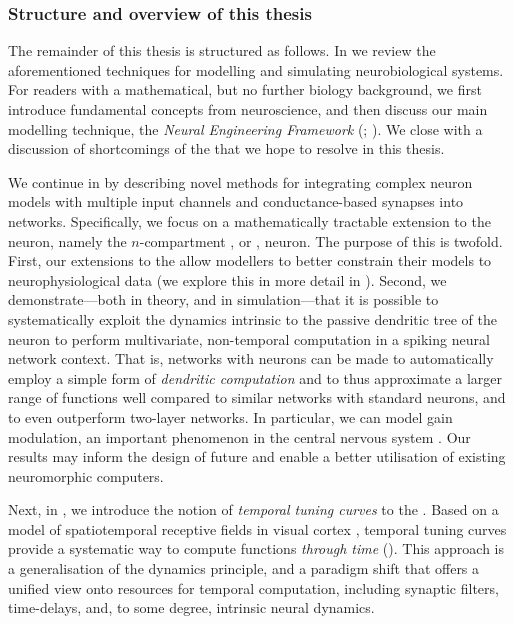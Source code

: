 \subsubsection{Structure and overview of this thesis}

The remainder of this thesis is structured as follows.
In  we review the aforementioned techniques for modelling and simulating neurobiological systems.
For readers with a mathematical, but no further biology background, we first introduce fundamental concepts from neuroscience, and then discuss our main modelling technique, the \emph{Neural Engineering Framework} (\NEF; \cite{eliasmith2003neural}).
We close with a discussion of shortcomings of the \NEF that we hope to resolve in this thesis.

We continue in  by describing novel methods for integrating complex neuron models with multiple input channels and conductance-based synapses into \NEF networks.
Specifically, we focus on a mathematically tractable extension to the \LIF neuron, namely the $n$-compartment \LIF, or \nlif, neuron.
The purpose of this is twofold.
First, our extensions to the \NEF allow modellers to better constrain their models to neurophysiological data (we explore this in more detail in ).
Second, we demonstrate---both in theory, and in simulation---that it is possible to systematically exploit the dynamics intrinsic to the passive dendritic tree of the \nlif neuron to perform multivariate, non-temporal computation in a spiking neural network context.
That is, \NEF networks with \nlif neurons can be made to automatically employ a simple form of \emph{dendritic computation} \citep{mel1994information,london2005dendritic} and to thus approximate a larger range of functions well compared to similar networks with standard \LIF neurons, and to even outperform two-layer networks.
In particular, we can model gain modulation, an important phenomenon in the central nervous system \citep{salinas2000gain,chance2002gain}.
Our results may inform the design of future and enable a better utilisation of existing neuromorphic computers.

Next, in , we introduce the notion of \emph{temporal tuning curves} to the \NEF.
Based on a model of spatiotemporal receptive fields in visual cortex \citep{carandini1999linearity}, temporal tuning curves provide a systematic way to compute functions \emph{through time} ().
This approach is a generalisation of the \NEF dynamics principle, and a paradigm shift that offers a unified view onto resources for temporal computation, including synaptic filters, time-delays, and, to some degree, intrinsic neural dynamics.

